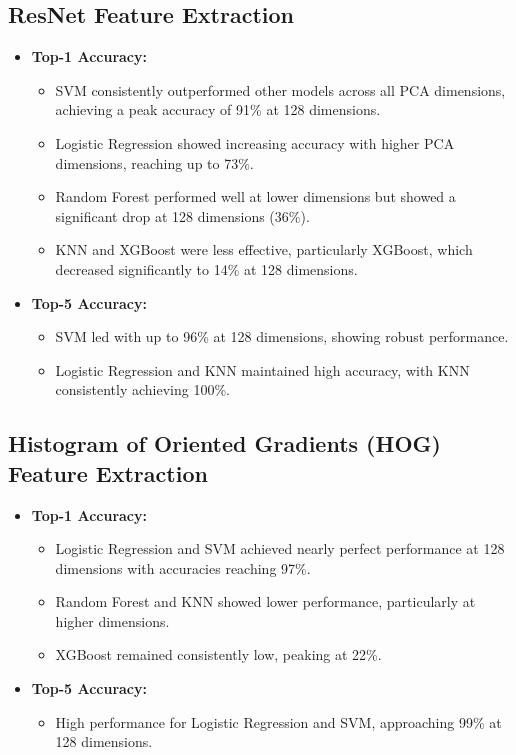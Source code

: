 \documentclass[a4paper]{article}
\theoremstyle{plain}
\theoremstyle{definition}
\begin{document}
\subsection{ResNet Feature Extraction}
\begin{itemize}
    \item \textbf{Top-1 Accuracy:}
    \begin{itemize}
        \item SVM consistently outperformed other models across all PCA dimensions, achieving a peak accuracy of 91\% at 128 dimensions.
        \item Logistic Regression showed increasing accuracy with higher PCA dimensions, reaching up to 73\%.
        \item Random Forest performed well at lower dimensions but showed a significant drop at 128 dimensions (36\%).
        \item KNN and XGBoost were less effective, particularly XGBoost, which decreased significantly to 14\% at 128 dimensions.
    \end{itemize}
    \item \textbf{Top-5 Accuracy:}
    \begin{itemize}
        \item SVM led with up to 96\% at 128 dimensions, showing robust performance.
        \item Logistic Regression and KNN maintained high accuracy, with KNN consistently achieving 100\%.
    \end{itemize}
\end{itemize}

\subsection{Histogram of Oriented Gradients (HOG) Feature Extraction}
\begin{itemize}
    \item \textbf{Top-1 Accuracy:}
    \begin{itemize}
        \item Logistic Regression and SVM achieved nearly perfect performance at 128 dimensions with accuracies reaching 97\%.
        \item Random Forest and KNN showed lower performance, particularly at higher dimensions.
        \item XGBoost remained consistently low, peaking at 22\%.
    \end{itemize}
    \item \textbf{Top-5 Accuracy:}
    \begin{itemize}
        \item High performance for Logistic Regression and SVM, approaching 99\% at 128 dimensions.
    \end{itemize}
\end{itemize}
\end{document}
